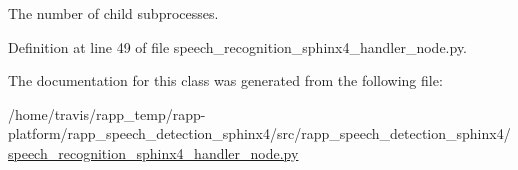 The number of child subprocesses. 



Definition at line 49 of file speech\-\_\-recognition\-\_\-sphinx4\-\_\-handler\-\_\-node.\-py.



The documentation for this class was generated from the following file\-:\begin{DoxyCompactItemize}
\item 
/home/travis/rapp\-\_\-temp/rapp-\/platform/rapp\-\_\-speech\-\_\-detection\-\_\-sphinx4/src/rapp\-\_\-speech\-\_\-detection\-\_\-sphinx4/\hyperlink{speech__recognition__sphinx4__handler__node_8py}{speech\-\_\-recognition\-\_\-sphinx4\-\_\-handler\-\_\-node.\-py}\end{DoxyCompactItemize}
